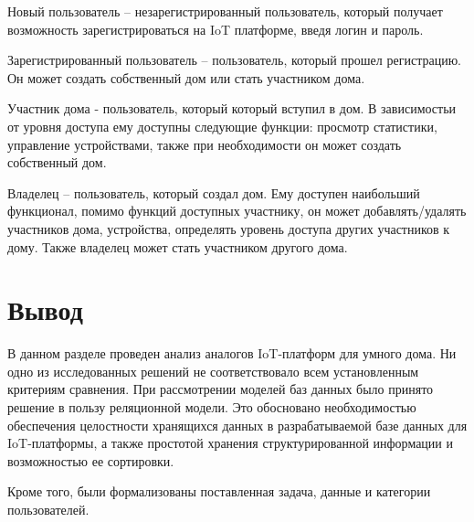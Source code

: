 Новый пользователь -- незарегистрированный пользователь, который получает возможность зарегистрироваться 
на IoT платформе, введя логин и пароль. 

Зарегистрированный пользователь -- пользователь, который прошел регистрацию. Он может создать собственный дом или стать участником 
дома.

Участник дома - пользователь, который который вступил в дом. В зависимостьи от уровня доступа ему доступны следующие функции:
просмотр статистики, управление устройствами, также при необходимости он может создать собственный дом.

Владелец -- пользователь, который создал дом. Ему доступен наибольший функционал, помимо функций доступных участнику,
он может добавлять/удалять участников дома, устройства, определять уровень доступа других участников к дому. Также владелец 
может стать участником другого дома.

\section*{Вывод}

В данном разделе проведен анализ аналогов IoT-платформ для умного дома.
Ни одно из исследованных решений не соответствовало всем установленным критериям сравнения. 
При рассмотрении моделей баз данных было принято решение в пользу реляционной модели. 
Это обосновано необходимостью обеспечения целостности хранящихся данных в разрабатываемой базе данных 
для IoT-платформы, а также простотой хранения структурированной информации и возможностью ее сортировки.

Кроме того, были формализованы поставленная задача, данные и категории пользователей.
